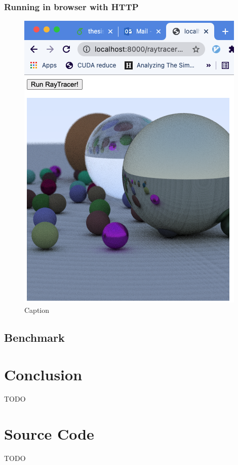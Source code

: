 \documentclass[11pt]{book}
\begin{document}
\subsection{Running in browser with HTTP}




\begin{figure}[htbp]
    \centering
    \includegraphics[scale=0.6]{figures/raytracer.png}
    \caption{Caption}
    \label{fig:mandelbrot}
\end{figure}

\section{Benchmark}
\chapter{Conclusion}

TODO


\appendix
\chapter{Source Code}

TODO



\printbibliography[heading=bibintoc]
\end{document}
